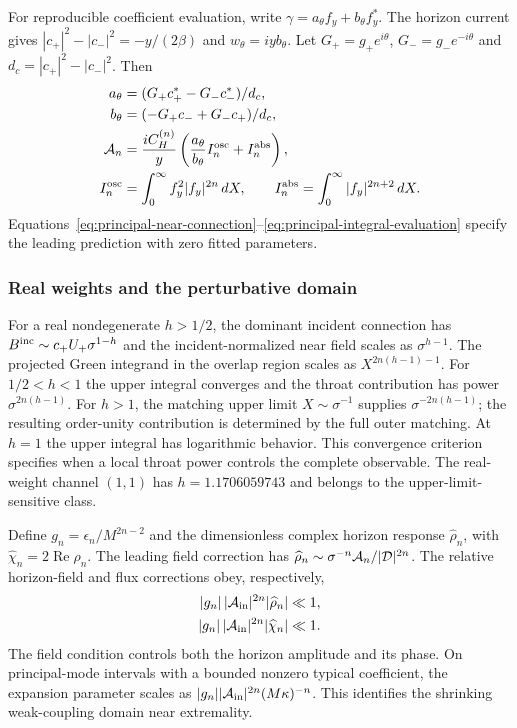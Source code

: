\documentclass[aps,prd,twocolumn,10pt,nofootinbib,superscriptaddress,floatfix]{revtex4-2}
\begin{document}
For reproducible coefficient evaluation, write $\gamma=a_\theta f_y+
b_\theta f_y^*$.  The horizon current gives
$|c_+|^2-|c_-|^2=-y/(2\beta)$ and $w_\theta=iyb_\theta$.
Let $G_+=g_+e^{i\theta}$, $G_-=g_-e^{-i\theta}$ and
$d_c=|c_+|^2-|c_-|^2$.  Then
\begin{align}
a_\theta&=(G_+c_+^*-G_-c_-^*)/d_c,\nonumber\\
b_\theta&=(-G_+c_-+G_-c_+)/d_c,\nonumber\\
{\cal A}_n&=\frac{iC_H^{(n)}}{y}
\left(\frac{a_\theta}{b_\theta}I_n^{\rm osc}+I_n^{\rm abs}\right),\nonumber\\
I_n^{\rm osc}&=\int_0^\infty f_y^2|f_y|^{2n}\,dX,\qquad
I_n^{\rm abs}=\int_0^\infty|f_y|^{2n+2}\,dX.
\label{eq:principal-integral-evaluation}
\end{align}
Equations~\eqref{eq:principal-near-connection}--\eqref{eq:principal-integral-evaluation}
specify the leading prediction with zero fitted parameters.

\subsubsection{Real weights and the perturbative domain}

For a real nondegenerate $h>1/2$, the dominant incident connection has
$B^{\rm inc}\sim c_+U_+\sigma^{1-h}$ and the incident-normalized near
field scales as $\sigma^{h-1}$.  The projected Green integrand in the
overlap region scales as $X^{2n(h-1)-1}$.
For $1/2<h<1$ the upper integral converges and the throat contribution
has power $\sigma^{2n(h-1)}$.  For $h>1$, the matching upper limit
$X\sim\sigma^{-1}$ supplies $\sigma^{-2n(h-1)}$; the resulting
order-unity contribution is determined by the full outer matching.
At $h=1$ the upper integral has logarithmic behavior.
This convergence criterion specifies when a local throat power controls
the complete observable.  The real-weight channel $(1,1)$ has
$h=1.1706059743$ and belongs to the upper-limit-sensitive class.

Define $g_n=\epsilon_n/M^{2n-2}$ and the dimensionless complex horizon
response $\widehat\rho_n$, with
$\widehat\chi_n=2\operatorname{Re}\widehat\rho_n$.
The leading field correction has
$\widehat\rho_n\sim\sigma^{-n}{\cal A}_n/|{\cal D}|^{2n}$.
The relative horizon-field and flux corrections obey, respectively,
\begin{equation}
\begin{split}
|g_n|\,|{\cal A}_{\rm in}|^{2n}|\widehat\rho_n|&\ll1,\\
|g_n|\,|{\cal A}_{\rm in}|^{2n}|\widehat\chi_n|&\ll1.
\end{split}
\label{eq:principal-validity}
\end{equation}
The field condition controls both the horizon amplitude and its phase.
On principal-mode intervals with a bounded nonzero typical coefficient,
the expansion parameter scales as
$|g_n||{\cal A}_{\rm in}|^{2n}(M\kappa)^{-n}$.
This identifies the shrinking weak-coupling domain near extremality.
\end{document}
